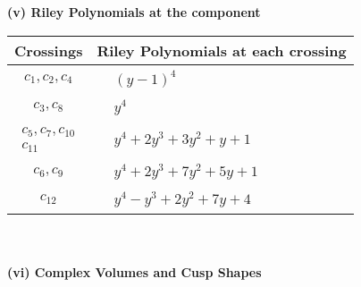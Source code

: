 \documentclass[1p]{elsarticle_modified}
\theoremstyle{definition}
\begin{document}
\newpage\renewcommand{\arraystretch}{1}
\flushleft \textbf{(v) Riley Polynomials at the component}\newline \\
\begin{tabular}{m{50pt}|m{274pt}}
Crossings & \hspace{64pt}Riley Polynomials at each crossing \\
\hline $$\begin{aligned}c_{1},c_{2},c_{4}\end{aligned}$$&$\begin{aligned}
&(y-1)^4
\end{aligned}$\\
\hline $$\begin{aligned}c_{3},c_{8}\end{aligned}$$&$\begin{aligned}
&y^4
\end{aligned}$\\
\hline $$\begin{aligned}c_{5},c_{7},c_{10}\\c_{11}\end{aligned}$$&$\begin{aligned}
&y^4+2 y^3+3 y^2+y+1
\end{aligned}$\\
\hline $$\begin{aligned}c_{6},c_{9}\end{aligned}$$&$\begin{aligned}
&y^4+2 y^3+7 y^2+5 y+1
\end{aligned}$\\
\hline $$\begin{aligned}c_{12}\end{aligned}$$&$\begin{aligned}
&y^4- y^3+2 y^2+7 y+4
\end{aligned}$\\
\hline
\end{tabular}\\~\\
\newpage\flushleft \textbf{(vi) Complex Volumes and Cusp Shapes}
\end{document}
